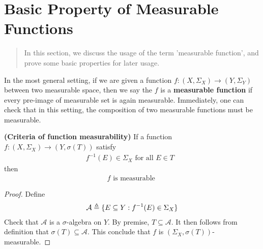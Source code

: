 \documentclass{report}
\begin{document}
\section{Basic Property of Measurable Functions}
\begin{abstract}
In this section, we discuss the usage of the term 'measurable function', and prove some basic properties for later usage. 
\end{abstract}
\begin{mdframed}
  In the most general setting, if we are given a function $f:(X,\Sigma_X)\rightarrow (Y,\Sigma_Y)$ between two measurable space, then we say the $f$ is a \textbf{measurable function} if every pre-image of measurable set is again measurable. Immediately, one can check that in this setting, the composition of two measurable functions must be measurable.
\end{mdframed}
\begin{theorem}
\label{EDm}
\textbf{(Criteria of function measurability)} If a function $f:(X,\Sigma_X)\rightarrow (Y,\sigma (T))$ satisfy 
\begin{align*}
f^{-1}(E)\in \Sigma_X\text{ for all $E \in T$ }
\end{align*}
then 
\begin{align*}
f\text{ is measurable }
\end{align*}
\end{theorem}
\begin{proof}
Define 
\begin{align*}
\mathcal{A}\triangleq \{ E \subseteq Y: f^{-1}(E)\in \Sigma_X \}
\end{align*}
Check that $\mathcal{A}$ is a $\sigma$-algebra on $Y$. By premise, $T \subseteq \mathcal{A}$. It then follows from definition that $\sigma (T)\subseteq \mathcal{A}$. This conclude that $f$ is  $(\Sigma_X, \sigma(T))$-measurable. 
\end{proof}
\end{document}

